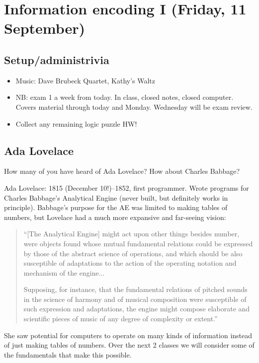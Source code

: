 \documentclass{article}
\begin{document}
\newpage
\section{Information encoding I (Friday, 11 September)}

\subsection*{Setup/administrivia}

\begin{itemize}
\item Music: Dave Brubeck Quartet, Kathy's Waltz
\item NB: exam 1 a week from today.  In class, closed notes, closed
  computer.  Covers material through today and Monday.  Wednesday will
  be exam review.
\item Collect any remaining logic puzzle HW!
\end{itemize}

\subsection*{Ada Lovelace}

How many of you have heard of Ada Lovelace?  How about Charles
Babbage?

Ada Lovelace: 1815 (December 10!)--1852, first programmer.  Wrote
programs for Charles Babbage's Analytical Engine (never built, but
definitely works in principle).  Babbage's purpose for the AE was
limited to making tables of numbers, but Lovelace had a much more
expansive and far-seeing vision:

\begin{quote}
``[The Analytical Engine] might act upon other things besides number,
were objects found whose mutual fundamental relations could be
expressed by those of the abstract science of operations, and which
should be also susceptible of adaptations to the action of the
operating notation and mechanism of the engine...

Supposing, for instance, that the fundamental relations of pitched
sounds in the science of harmony and of musical composition were
susceptible of such expression and adaptations, the engine might
compose elaborate and scientific pieces of music of any degree of
complexity or extent.''
\end{quote}

She saw potential for computers to operate on many kinds of
information instead of just making tables of numbers.  Over the next 2
classes we will consider some of the fundamentals that make this
possible.
\end{document}
